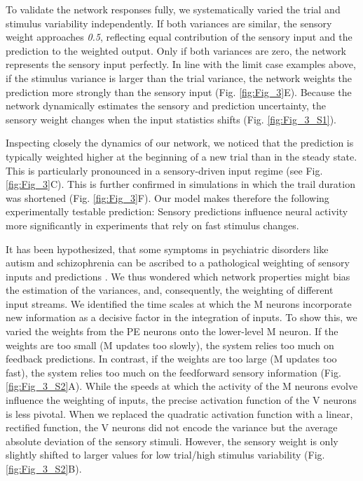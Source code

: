 \documentclass[10pt,a4paper,draft]{article}
\begin{document}
To validate the network responses fully, we systematically varied the trial and stimulus variability independently. If both variances are similar, the sensory weight approaches \textit{0.5}, reflecting equal contribution of the sensory input and the prediction to the weighted output. Only if both variances are zero, the network represents the sensory input perfectly. In line with the limit case examples above, if the stimulus variance is larger than the trial variance, the network weights the prediction more strongly than the sensory input (Fig. \ref{fig:Fig_3}E). Because the network dynamically estimates the sensory and prediction uncertainty, the sensory weight changes when the input statistics shifts (Fig. \ref{fig:Fig_3_S1}). 

Inspecting closely the dynamics of our network, we noticed that the prediction is typically weighted higher at the beginning of a new trial than in the steady state. This is particularly pronounced in a sensory-driven input regime (see Fig. \ref{fig:Fig_3}C). This is further confirmed in simulations in which the trail duration was shortened (Fig. \ref{fig:Fig_3}F). Our model makes therefore the following experimentally testable prediction: Sensory predictions influence neural activity more significantly in experiments that rely on fast stimulus changes. 

It has been hypothesized, that some symptoms in psychiatric disorders like autism and schizophrenia can be ascribed to a pathological weighting of sensory inputs and predictions \citep{yon2021precision}. We thus wondered which network properties might bias the estimation of the variances, and, consequently, the weighting of different input streams. We identified the time scales at which the M neurons incorporate new information as a decisive factor in the integration of inputs. To show this, we varied the weights from the PE neurons onto the lower-level M neuron. If the weights are too small (M updates too slowly), the system relies too much on feedback predictions. In contrast, if the weights are too large (M updates too fast), the system relies too much on the feedforward sensory information (Fig. \ref{fig:Fig_3_S2}A). While the speeds at which the activity of the M neurons evolve influence the weighting of inputs, the precise activation function of the V neurons is less pivotal. When we replaced the quadratic activation function with a linear, rectified function, the V neurons did not encode the variance but the average absolute deviation of the sensory stimuli. However, the sensory weight is only slightly shifted to larger values for low trial/high stimulus variability (Fig. \ref{fig:Fig_3_S2}B). 
\end{document}

